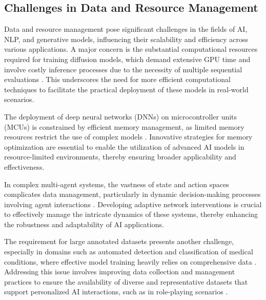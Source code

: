 \subsection{Challenges in Data and Resource Management} \label{subsec:Challenges in Data and Resource Management}



Data and resource management pose significant challenges in the fields of AI, NLP, and generative models, influencing their scalability and efficiency across various applications. A major concern is the substantial computational resources required for training diffusion models, which demand extensive GPU time and involve costly inference processes due to the necessity of multiple sequential evaluations \cite{rombach2022high}. This underscores the need for more efficient computational techniques to facilitate the practical deployment of these models in real-world scenarios.



The deployment of deep neural networks (DNNs) on microcontroller units (MCUs) is constrained by efficient memory management, as limited memory resources restrict the use of complex models \cite{zheng2024vmcucoordinatedmemorymanagement}. Innovative strategies for memory optimization are essential to enable the utilization of advanced AI models in resource-limited environments, thereby ensuring broader applicability and effectiveness.



In complex multi-agent systems, the vastness of state and action spaces complicates data management, particularly in dynamic decision-making processes involving agent interactions \cite{chen2024adaptivenetworkinterventioncomplex}. Developing adaptive network interventions is crucial to effectively manage the intricate dynamics of these systems, thereby enhancing the robustness and adaptability of AI applications.



The requirement for large annotated datasets presents another challenge, especially in domains such as automated detection and classification of medical conditions, where effective model training heavily relies on comprehensive data \cite{zolfaghari2023surveyautomateddetectionclassification}. Addressing this issue involves improving data collection and management practices to ensure the availability of diverse and representative datasets that support personalized AI interactions, such as in role-playing scenarios \cite{tao2024rolecraftglmadvancingpersonalizedroleplaying}.



